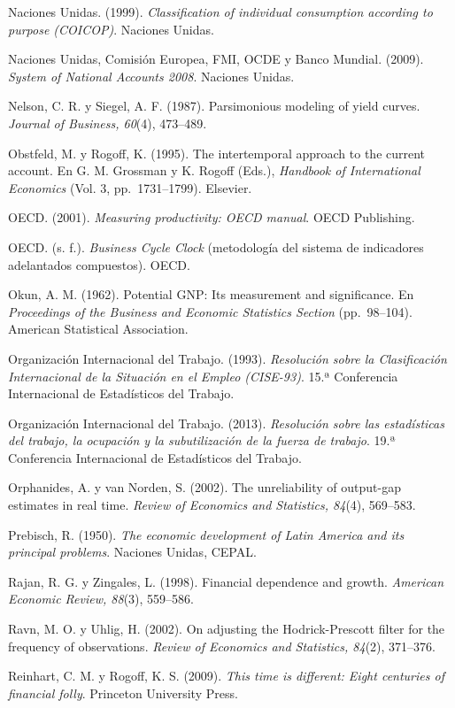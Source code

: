 Naciones Unidas. (1999). \emph{Classification of individual consumption
according to purpose (COICOP)}. Naciones Unidas.

Naciones Unidas, Comisión Europea, FMI, OCDE y Banco Mundial. (2009).
\emph{System of National Accounts 2008}. Naciones Unidas.

Nelson, C. R. y Siegel, A. F. (1987). Parsimonious modeling of yield
curves. \emph{Journal of Business, 60}(4), 473--489.

Obstfeld, M. y Rogoff, K. (1995). The intertemporal approach to the
current account. En G. M. Grossman y K. Rogoff (Eds.), \emph{Handbook of
International Economics} (Vol. 3, pp.~1731--1799). Elsevier.

OECD. (2001). \emph{Measuring productivity: OECD manual}. OECD
Publishing.

OECD. (s. f.). \emph{Business Cycle Clock} (metodología del sistema de
indicadores adelantados compuestos). OECD.

Okun, A. M. (1962). Potential GNP: Its measurement and significance. En
\emph{Proceedings of the Business and Economic Statistics Section}
(pp.~98--104). American Statistical Association.

Organización Internacional del Trabajo. (1993). \emph{Resolución sobre
la Clasificación Internacional de la Situación en el Empleo (CISE-93)}.
15.ª Conferencia Internacional de Estadísticos del Trabajo.

Organización Internacional del Trabajo. (2013). \emph{Resolución sobre
las estadísticas del trabajo, la ocupación y la subutilización de la
fuerza de trabajo}. 19.ª Conferencia Internacional de Estadísticos del
Trabajo.

Orphanides, A. y van Norden, S. (2002). The unreliability of output-gap
estimates in real time. \emph{Review of Economics and Statistics,
84}(4), 569--583.

Prebisch, R. (1950). \emph{The economic development of Latin America and
its principal problems}. Naciones Unidas, CEPAL.

Rajan, R. G. y Zingales, L. (1998). Financial dependence and growth.
\emph{American Economic Review, 88}(3), 559--586.

Ravn, M. O. y Uhlig, H. (2002). On adjusting the Hodrick-Prescott filter
for the frequency of observations. \emph{Review of Economics and
Statistics, 84}(2), 371--376.

Reinhart, C. M. y Rogoff, K. S. (2009). \emph{This time is different:
Eight centuries of financial folly}. Princeton University Press.

